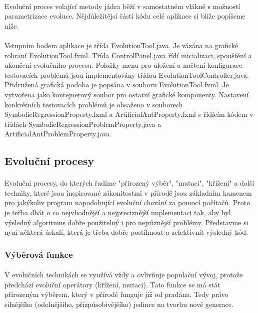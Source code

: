 \documentclass[bc,male,java,dept460]{diploma}		%
\begin{document}

\paragraph*{}
Evoluční proces volající metody jádra běží v samostatném vlákně s možností parametrizace evoluce. Nějdůležítějsí části kódu celé aplikace si blíže popíšeme níže.

\paragraph*{}
Vstupním bodem aplikace je třída EvolutionTool.java. Je vázána na grafické rohraní EvolutionTool.fxml. Třída ControlPanel.java řídí inicializaci, spouštění a ukončení evolučního procesu. Položky menu pro uložení a načtení konfigurace testovacích problémů jsou implementovány třídou EvolutionToolController.java. Přidružená grafická podoba je popsána v souboru EvolutionTool.fxml. Je vytvořena jako kontejnerový soubor pro ostatní grafické komponenty. Nastavení konkrétních testovacích problémů je obsaženo v souborech SymbolicRegressionProperty.fxml a ArtificialAntProperty.fxml s řídícím kódem v třídách SymbolicRegressionProblemProperty.java a ArtificialAntProblemProperty.java.



\subsection{Evoluční procesy}
\paragraph*{}
Evoluční procesy, do kterých řadíme "přirozený výběr", "mutaci", "křížení" a další techniky, které jsou inspirované zákonitostmi v přírodě jsou základním kamenem pro jakýkoliv program napodobující evoluční chování za pomocí počítačů. Proto je teřba dbát o co nejvhodnější a nejpreciznější implementaci tak, aby byl výsledný algoritmus dobře použitelný i pro nejrůznější problémy. Představme si nyní některá úskalí, která je třeba dobře postihnout a zefektivnít výsledný kód.

\subsubsection{Výběrová funkce}
\paragraph*{}
V evolučních technikách se využívá vždy a ovlivňuje populační vývoj, protože předchází evoluční operátory (křížení, mutaci). Tato funkce se má stát přirozeným výběrem, který v přírodě funguje již od pradána. Tedy právo silnějšího (odolnějšího, přizpůsobivějšího) jedince na tvorbu nové generace.
\end{document}
